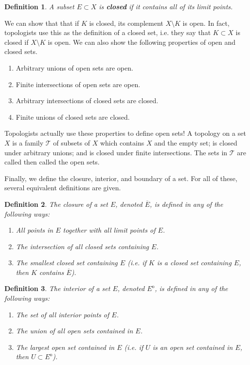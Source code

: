 \documentclass[12pt]{amsart}         %
\newtheorem{definition}{Definition}[section]
\theoremstyle{remark}
\begin{document}
\begin{definition}
A subset $E \subset X$ is \textbf{closed} if it contains all of its limit points.
\end{definition}

We can show that that if $K$ is closed, its complement $X\setminus K$ is open. In fact, topologists use this as the definition of a closed set, i.e. they say that $K \subset X$ is closed if $X\setminus K$ is open. We can also show the following properties of open and closed sets.

\begin{enumerate}
    \item Arbitrary unions of open sets are open.
    \item Finite intersections of open sets are open.
    \item Arbitrary intersections of closed sets are closed.
    \item Finite unions of closed sets are closed.
\end{enumerate}

Topologists actually use these properties to define open sets! A topology on a set $X$ is a family $\mathcal{T}$ of subsets of $X$ which contains $X$ and the empty set; is closed under arbitrary unions; and is closed under finite intersections. The sets in $\mathcal{T}$ are called then called the open sets. 

Finally, we define the closure, interior, and boundary of a set. For all of these, several equivalent definitions are given.

\begin{definition}
The \emph{closure} of a set $E$, denoted $\overline{E}$, is defined in any of the following ways:
\begin{enumerate}
    \item All points in $E$ together with all limit points of $E$.
    \item The intersection of all closed sets containing $E$.
    \item The smallest closed set containing $E$ (i.e. if $K$ is a closed set containing $E$, then $K$ contains $\overline{E}$).
\end{enumerate}
\end{definition}

\begin{definition}
The \emph{interior} of a set $E$, denoted $E^\mathrm{o}$, is defined in any of the following ways:
\begin{enumerate}
    \item The set of all interior points of $E$.
    \item The union of all open sets contained in $E$.
    \item The largest open set contained in $E$ (i.e. if $U$ is an open set contained in $E$, then $U \subset E^\mathrm{o}$).
\end{enumerate}
\end{definition}
\end{document}
